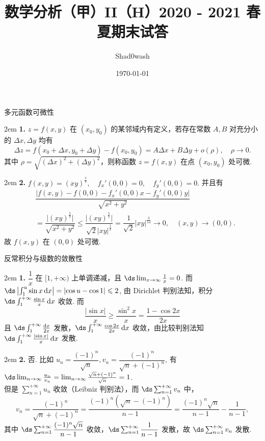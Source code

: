 \documentclass[UTF8,14pt,normal]{ctexart}
\title{数学分析（甲）II（H）2020 - 2021 春夏期末试答}
\author{Shad0wash}
\date{\today}
\begin{document}
\maketitle

多元函数可微性

    \hangindent 2em
    \noindent
    \textbf{1.} \(z = f(x, y)\) 在 \((x_0, y_0)\) 的某邻域内有定义，若存在常数 \(A, B\) 对充分小的 \(\Delta x, \Delta y\) 均有
    \[
        \Delta z = f(x_0 + \Delta x, y_0 + \Delta y) - f(x_0, y_0) = A \Delta x + B \Delta y + o(\rho), \quad \rho \rightarrow 0.
    \]
    其中 \(\rho = \sqrt{(\Delta x)^2 + (\Delta y)^2}\)，则称函数 \(z = f(x, y)\) 在点 \((x_0, y_0)\) 处可微.

    \hangindent 2em
    \noindent
    \textbf{2.} \(f(x, y) = (xy)^{\frac{5}{7}}, \quad f_x'(0, 0) = 0, \quad f_y'(0, 0) = 0.\) 并且有
    \begin{align*}
        & \dfrac{\lvert f(x, y) - f(0, 0) - f_x'(0, 0)x - f_y'(0, 0)y \rvert}{\sqrt{x^2 + y^2}} \\
        & = \dfrac{\lvert (xy)^{\frac{5}{7}} \rvert}{\sqrt{x^2 + y^2}} \leqslant \dfrac{\lvert (xy)^{\frac{5}{7}} \rvert}{\sqrt{2} \lvert xy \rvert^{\frac{1}{2}}} = \dfrac{1}{\sqrt{2}} \lvert xy \rvert^{\frac{3}{14}} \rightarrow 0, \quad (x, y) \rightarrow (0, 0).
    \end{align*}
    故 \(f(x, y)\) 在 \((0, 0)\) 处可微.

反常积分与级数的敛散性

    \hangindent 2em
    \noindent
    \textbf{1.} \(\dfrac{1}{x}\) 在 \([1, +\infty)\) 上单调递减，且 \(\ds \lim_{x \to \infty} \frac{1}{x} = 0\). 而 \(\ds \left\lvert \int_1^u \sin x \dd{x} \right\rvert = \lvert \cos u - \cos 1 \rvert \leqslant 2\), 由 Dirichlet 判别法知，积分 \(\ds \int_1^{+\infty} \frac{\sin x}{x} \dd{x}\) 收敛.
    而
    \[
        \dfrac{\lvert \sin x \rvert}{x} \geqslant \dfrac{\sin^2 x}{x} = \dfrac{1 - \cos 2x}{2x}
    \]
    且 \(\ds \int_1^{+\infty} \frac{\dd{x}}{2x}\) 发散，\(\ds \int_1^{+\infty} \frac{\cos 2x}{2x} \dd{x}\) 收敛，由比较判别法知 \(\ds \int_1^{+\infty} \frac{\lvert \sin x \rvert}{x} \dd{x}\) 发散.

    \hangindent 2em
    \noindent
    \textbf{2.} 否. 比如 \(u_n = \dfrac{(-1)^n}{\sqrt{n}}, v_n = \dfrac{(-1)^n}{\sqrt{n} + (-1)^n}\), 有 \(\ds \lim_{n \to \infty} \frac{u_n}{v_n} = \lim_{n \to \infty} \frac{\sqrt{n} + (-1)^n}{\sqrt{n}} = 1\). \\
    但是 \(\sum_{n = 1}^{+\infty} u_n\) 收敛（Leibniz 判别法），而 \(\ds \sum_{n = 1}^{+\infty} v_n\) 中，
    \[
        v_n = \dfrac{(-1)^n}{\sqrt{n} + (-1)^n} = \dfrac{(-1)^n(\sqrt{n} - (-1)^n)}{n - 1} = \dfrac{(-1)^n\sqrt{n}}{n - 1} - \dfrac{1}{n - 1},
    \]
    其中 \(\ds \sum_{n = 1}^{+\infty} \dfrac{(-1)^n\sqrt{n}}{n - 1}\) 收敛，\(\ds \sum_{n = 1}^{+\infty} \dfrac{1}{n - 1}\) 发散，故 \(\ds \sum_{n = 1}^{+\infty} v_n\) 发散.
\end{document}
